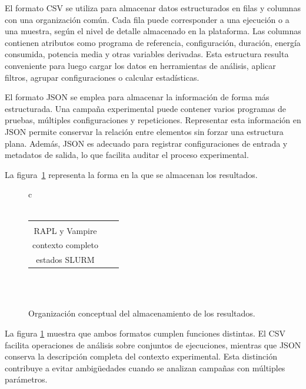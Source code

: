El formato CSV se utiliza para almacenar datos estructurados en filas y columnas con una organización común. Cada fila puede corresponder a una ejecución o a una muestra, según el nivel de detalle almacenado en la plataforma. Las columnas contienen atributos como programa de referencia, configuración, duración, energía consumida, potencia media y otras variables derivadas. Esta estructura resulta conveniente para luego cargar los datos en herramientas de análisis, aplicar filtros, agrupar configuraciones o calcular estadísticas.

El formato JSON se emplea para almacenar la información de forma más estructurada. Una campaña experimental puede contener varios programas de pruebas, múltiples configuraciones y repeticiones. Representar esta información en JSON permite conservar la relación entre elementos sin forzar una estructura plana. Además, JSON es adecuado para registrar configuraciones de entrada y metadatos de salida, lo que facilita auditar el proceso experimental.

La figura~\ref{fig:almacenamiento-datos} representa la forma en la que se almacenan los resultados. 

\begin{figure}[htbp]
\centering
\begin{tabular}{c}
 \\[3pt]
\diagramdown \\[3pt]
\begin{tabular}{c@{\hspace{0.35cm}}c@{\hspace{0.35cm}}c}
\diagramnode[0.24\textwidth]{Series CSV\\RAPL y Vampire} &
\diagramnode[0.24\textwidth]{Raw JSON\\contexto completo} &
\diagramnode[0.24\textwidth]{Logs y\\estados SLURM}
\end{tabular} \\[3pt]
\diagramdown \\[3pt]
\end{tabular}
\caption{Organización conceptual del almacenamiento de los resultados.}
\label{fig:almacenamiento-datos}
\end{figure}

La figura \ref{fig:almacenamiento-datos} muestra que ambos formatos cumplen funciones distintas. El CSV facilita operaciones de análisis sobre conjuntos de ejecuciones, mientras que JSON conserva la descripción completa del contexto experimental. Esta distinción contribuye a evitar ambigüedades cuando se analizan campañas con múltiples parámetros.

